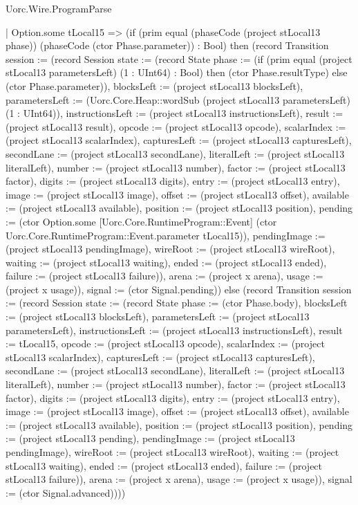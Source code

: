 \begin{lexlean}{Uorc.Wire.ProgramParse}
\begin{semanticmodule}
{      | Option.some tLocal15 => (if (prim equal (phaseCode (project stLocal13 phase)) (phaseCode (ctor Phase.parameter)) : Bool) then (record Transition {session := (record Session {state := (record State {phase := (if (prim equal (project stLocal13 parametersLeft) (1 : UInt64) : Bool) then (ctor Phase.resultType) else (ctor Phase.parameter)), blocksLeft := (project stLocal13 blocksLeft), parametersLeft := (Uorc.Core.Heap::wordSub (project stLocal13 parametersLeft) (1 : UInt64)), instructionsLeft := (project stLocal13 instructionsLeft), result := (project stLocal13 result), opcode := (project stLocal13 opcode), scalarIndex := (project stLocal13 scalarIndex), capturesLeft := (project stLocal13 capturesLeft), secondLane := (project stLocal13 secondLane), literalLeft := (project stLocal13 literalLeft), number := (project stLocal13 number), factor := (project stLocal13 factor), digits := (project stLocal13 digits), entry := (project stLocal13 entry), image := (project stLocal13 image), offset := (project stLocal13 offset), available := (project stLocal13 available), position := (project stLocal13 position), pending := (ctor Option.some [Uorc.Core.RuntimeProgram::Event] (ctor Uorc.Core.RuntimeProgram::Event.parameter tLocal15)), pendingImage := (project stLocal13 pendingImage), wireRoot := (project stLocal13 wireRoot), waiting := (project stLocal13 waiting), ended := (project stLocal13 ended), failure := (project stLocal13 failure)}), arena := (project x arena), usage := (project x usage)}), signal := (ctor Signal.pending)}) else (record Transition {session := (record Session {state := (record State {phase := (ctor Phase.body), blocksLeft := (project stLocal13 blocksLeft), parametersLeft := (project stLocal13 parametersLeft), instructionsLeft := (project stLocal13 instructionsLeft), result := tLocal15, opcode := (project stLocal13 opcode), scalarIndex := (project stLocal13 scalarIndex), capturesLeft := (project stLocal13 capturesLeft), secondLane := (project stLocal13 secondLane), literalLeft := (project stLocal13 literalLeft), number := (project stLocal13 number), factor := (project stLocal13 factor), digits := (project stLocal13 digits), entry := (project stLocal13 entry), image := (project stLocal13 image), offset := (project stLocal13 offset), available := (project stLocal13 available), position := (project stLocal13 position), pending := (project stLocal13 pending), pendingImage := (project stLocal13 pendingImage), wireRoot := (project stLocal13 wireRoot), waiting := (project stLocal13 waiting), ended := (project stLocal13 ended), failure := (project stLocal13 failure)}), arena := (project x arena), usage := (project x usage)}), signal := (ctor Signal.advanced)})))
}
\end{semanticmodule}
\end{lexlean}
